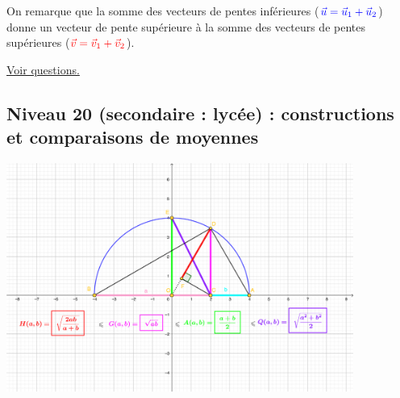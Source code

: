 \documentclass[11pt]{article}
\begin{document}
On remarque que la somme des vecteurs de pentes inférieures
(\(\textcolor{blue}{\vec{u} = \vec{u}_1 + \vec{u}_2}\)) donne un vecteur
de pente supérieure à la somme des vecteurs de pentes supérieures
(\(\textcolor{red}{\vec{v} = \vec{v}_1 + \vec{v}_2}\)).



\hyperref[org5001152]{Voir questions.}


\newpage

\subsection{Niveau 20 (secondaire : lycée) : constructions et comparaisons de moyennes}
\label{sec:orge3ac222}

\label{org9f7ca9d}


\begin{center}
\includegraphics[width=0.9\linewidth, height=7.5cm, keepaspectratio]{./images/compare-means.png}
\end{center}
\label{org8d23b4e}

\newpage
\end{document}
